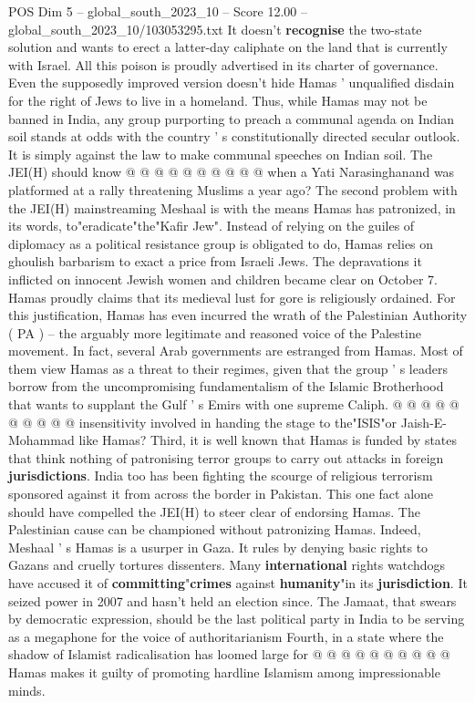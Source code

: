 \begin{textsample}{POS Dim 5 – global\_south\_2023\_10 – Score 12.00 – global\_south\_2023\_10/103053295.txt}
It doesn't \textbf{recognise} the two-state solution and wants to erect a latter-day caliphate on the land that is currently with Israel.
All this poison is proudly advertised in its charter of governance.
Even the supposedly improved version doesn't hide Hamas ' unqualified disdain for the right of Jews to live in a homeland.
Thus, while Hamas may not be banned in India, any group purporting to preach a communal agenda on Indian soil stands at odds with the country ' s constitutionally directed secular outlook.
It is simply against the law to make communal speeches on Indian soil.
The JEI(H) should know @ @ @ @ @ @ @ @ @ @ when a Yati Narasinghanand was platformed at a rally threatening Muslims a year ago?
The second problem with the JEI(H) mainstreaming Meshaal is with the means Hamas has patronized, in its words, to"eradicate"the"Kafir Jew".
Instead of relying on the guiles of diplomacy as a political resistance group is obligated to do, Hamas relies on ghoulish barbarism to exact a price from Israeli Jews.
The depravations it inflicted on innocent Jewish women and children became clear on October 7.
Hamas proudly claims that its medieval lust for gore is religiously ordained.
For this justification, Hamas has even incurred the wrath of the Palestinian Authority ( PA ) -- the arguably more legitimate and reasoned voice of the Palestine movement.
In fact, several Arab governments are estranged from Hamas.
Most of them view Hamas as a threat to their regimes, given that the group ' s leaders borrow from the uncompromising fundamentalism of the Islamic Brotherhood that wants to supplant the Gulf ' s Emirs with one supreme Caliph. @ @ @ @ @ @ @ @ @ @ insensitivity involved in handing the stage to the"ISIS"or Jaish-E-Mohammad like Hamas?
Third, it is well known that Hamas is funded by states that think nothing of patronising terror groups to carry out attacks in foreign \textbf{jurisdictions}.
India too has been fighting the scourge of religious terrorism sponsored against it from across the border in Pakistan.
This one fact alone should have compelled the JEI(H) to steer clear of endorsing Hamas.
The Palestinian cause can be championed without patronizing Hamas.
Indeed, Meshaal ' s Hamas is a usurper in Gaza.
It rules by denying basic rights to Gazans and cruelly tortures dissenters.
Many \textbf{international} rights watchdogs have accused it of \textbf{committing}"\textbf{crimes} against \textbf{humanity}"in its \textbf{jurisdiction}.
It seized power in 2007 and hasn't held an election since.
The Jamaat, that swears by democratic expression, should be the last political party in India to be serving as a megaphone for the voice of authoritarianism Fourth, in a state where the shadow of Islamist radicalisation has loomed large for @ @ @ @ @ @ @ @ @ @ Hamas makes it guilty of promoting hardline Islamism among impressionable minds.

\end{textsample}

